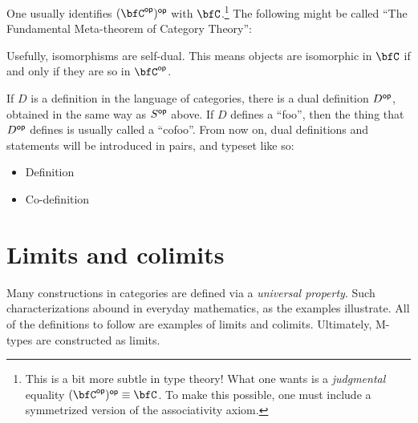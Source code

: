 \documentclass[a5paper]{article}
\newcommand{\dual}[2]{
  \begin{itemize}\renewcommand{\labelitemi}{$\circ $}
    \itemsep0em
    \item #1
    \item #2
   \end{itemize}
}
\begin{document}
One usually identifies $(\bfC^\op)^\op$ with $\bfC$.\footnote{This is a bit more
  subtle in type theory! What one wants is a \textit{judgmental} equality
  $(\bfC^\op)^\op\jdeq \bfC$. To make this possible, one must include a
  symmetrized version of the associativity axiom.}
The following might be called ``The Fundamental Meta-theorem of Category Theory'':


Usefully, isomorphisms are self-dual. This means objects are isomorphic in
$\bfC$ if and only if they are so in $\bfC^\op$.

If $D$ is a definition in the language of categories, there is a dual
definition $D^{\mathsf{op}}$, obtained in the same way as $S^{\mathsf{op}}$ above. If $D$ defines a
``foo'', then the thing that $D^{\mathsf{op}}$ defines is usually called a ``cofoo''.
From now on, dual definitions and statements will be introduced in pairs, and
typeset like so:

\dual{
  Definition
}{
  Co-definition
}

\section{Limits and colimits}
\label{sec:limits-and-colimits}

Many constructions in categories are defined via a \textit{universal property}.
Such characterizations abound in everyday mathematics, as the examples
illustrate. All of the definitions to follow are examples of limits and colimits.
Ultimately, M-types are constructed as limits.

\end{document}
